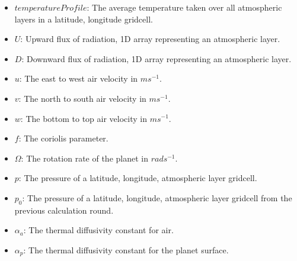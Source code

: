 \begin{itemize}
    \item $temperatureProfile$: The average temperature taken over all atmospheric layers in a latitude, longitude gridcell.
    \item $U$: Upward flux of radiation, 1D array representing an atmospheric layer.
    \item $D$: Downward flux of radiation, 1D array representing an atmospheric layer.
    \item $u$: The east to west air velocity in $ms^{-1}$.
    \item $v$: The north to south air velocity in $ms^{-1}$.
    \item $w$: The bottom to top air velocity in $ms^{-1}$.
    \item $f$: The coriolis parameter.
    \item $\Omega$: The rotation rate of the planet in $rads^{-1}$.
    \item $p$: The pressure of a latitude, longitude, atmospheric layer gridcell.
    \item $p_0$: The pressure of a latitude, longitude, atmospheric layer gridcell from the previous calculation round.
    \item $\alpha_a$: The thermal diffusivity constant for air.
    \item $\alpha_p$: The thermal diffusivity constant for the planet surface.
\end{itemize}